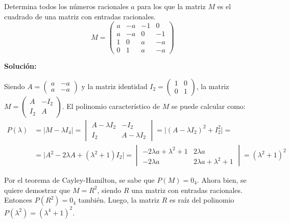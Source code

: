 \documentclass[../../main.tex]{subfiles}
\begin{document}
  \begin{shaded}
    Determina todos los números racionales $a$ para los que la matriz $M$ es el cuadrado de una matriz con entradas racionales.
    $$
    M = \begin{pmatrix}
      a & -a & -1 & 0 \\
      a & -a & 0 & -1 \\
      1 & 0 & a & -a \\
      0 & 1 & a & -a
    \end{pmatrix}
    $$
  \end{shaded}

  \textbf{Solución:}

  Siendo $A = \begin{pmatrix}
    a & -a \\
    a & -a
  \end{pmatrix}$ y la matriz identidad $I_2 = \begin{pmatrix}
    1 & 0 \\
    0 & 1
  \end{pmatrix}$, la matriz $M = \begin{pmatrix}
    A & -I_2 \\
    I_2 & A
  \end{pmatrix}$. El polinomio característico de $M$ se puede calcular como:
  \begin{equation*}
    \begin{split}
      P(\lambda) & = |M - \lambda I_4| =
      \begin{vmatrix}
        A - \lambda I_2 & -I_2 \\
        I_2 & A - \lambda I_2
      \end{vmatrix} =
      \big|(A - \lambda I_2)^2 + I_2^2\big| =
      \\ & =
      \big|A^2 - 2\lambda A + (\lambda^2 + 1)I_2\big| =
      \begin{vmatrix}
        -2\lambda a + \lambda^2 + 1 & 2\lambda a \\
        -2\lambda a & 2\lambda a + \lambda^2 + 1
      \end{vmatrix}
      = (\lambda^2 + 1)^2
    \end{split}
  \end{equation*}

  Por el teorema de Cayley-Hamilton, se sabe que $P(M) = 0_4$. Ahora bien, se quiere demostrar que $M = R^2$, siendo $R$ una matriz con entradas racionales. Entonces $P(R^2) = 0_4$ también. Luego, la matriz $R$ es raíz del polinomio $P(\lambda^2) = (\lambda^4 + 1)^2$.
\end{document}
